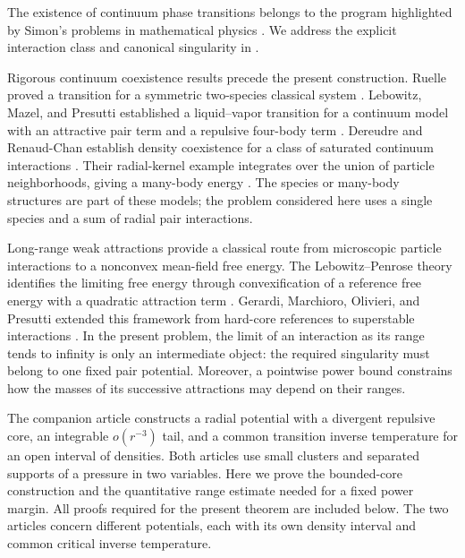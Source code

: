 The existence of continuum phase transitions belongs to the program
highlighted by Simon's problems in mathematical physics
\citep{Simon1984}.  We address the explicit interaction class and
canonical singularity in .

Rigorous continuum coexistence results precede the present construction.
Ruelle proved a transition for a symmetric two-species classical system
\citep{Ruelle1971}.  Lebowitz, Mazel, and Presutti established a
liquid--vapor transition for a continuum model with an attractive
pair term and a repulsive four-body term
\citep{LebowitzMazelPresutti1998,LebowitzMazelPresutti1999}.
Dereudre and Renaud-Chan establish density coexistence for a class of
saturated continuum interactions
\citep[Theorems~1--2]{DereudreRenaudChan2026}.
Their radial-kernel example integrates over the union of particle
neighborhoods, giving a many-body energy
\citep[Section~2.3, Example~3]{DereudreRenaudChan2026}.
The species or many-body structures are part of these models; the
problem considered here uses a single species and a sum of radial pair
interactions.

Long-range weak attractions provide a classical route from microscopic
particle interactions to a nonconvex mean-field free energy.  The
Lebowitz--Penrose theory identifies the limiting free energy through
convexification of a reference free energy with a quadratic attraction
term \citep{LebowitzPenrose1966}.  Gerardi, Marchioro, Olivieri, and
Presutti extended this framework from hard-core references to
superstable interactions \citep{GerardiEtAl1973}.  In the present problem, the limit of
an interaction as its range tends to infinity is only an intermediate
object: the required singularity must belong to one fixed pair
potential.  Moreover, a pointwise power bound constrains how the masses
of its successive attractions may depend on their ranges.

The companion article \citep[Theorem~1.1]{OpenAICompanion2026} constructs
a radial potential with a divergent repulsive core, an integrable
\(o(r^{-3})\) tail, and a common transition inverse temperature for an
open interval of densities.  Both articles use small clusters and
separated supports of a pressure in two variables.  Here we prove the
bounded-core construction and the quantitative range estimate needed
for a fixed power margin.  All proofs required for the present theorem
are included below.  The two articles concern different potentials,
each with its own density interval and common critical inverse temperature.

